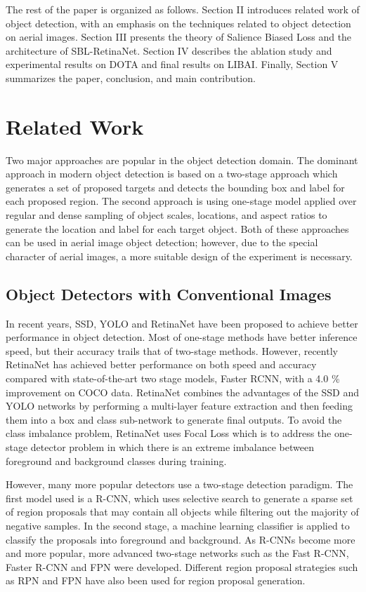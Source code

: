 \documentclass[conference]{IEEEtran}
\begin{document}
    The rest of the paper is organized as follows. Section II introduces related work of object detection, with an emphasis on the techniques related to object detection on aerial images. Section III presents the theory of Salience Biased Loss and the architecture of SBL-RetinaNet. Section IV describes the ablation study and experimental results on DOTA and final results on LIBAI. Finally, Section V summarizes the paper, conclusion, and main contribution.
\section{Related Work}		
Two major approaches are popular in the object detection domain. The dominant approach in modern object detection is based on a two-stage approach which generates a set of proposed targets and detects the bounding box and label for each proposed region. The second approach is using one-stage model applied over regular and dense sampling of object scales, locations, and aspect ratios to generate the location and label for each target object. Both of these approaches can be used in aerial image object detection; however, due to the special character of aerial images, a more suitable design of the experiment is necessary.

	\subsection{Object Detectors with Conventional Images }
    In recent years, SSD\cite{liu2016ssd}, YOLO\cite{redmon2017yolo9000} and RetinaNet\cite{lin2017focal} have been proposed to achieve better performance in object detection. Most of one-stage methods have better inference speed, but their accuracy trails that of two-stage methods. However, recently RetinaNet\cite{lin2017focal} has achieved better performance on both speed and accuracy compared with state-of-the-art two stage models, Faster RCNN\cite{ren2015faster}, with a 4.0 \% improvement on COCO data\cite{lin2014microsoft}.  RetinaNet\cite{lin2017focal} combines the advantages of the SSD\cite{liu2016ssd} and YOLO\cite{redmon2017yolo9000} networks by performing a  multi-layer feature extraction and then feeding them into a box and class sub-network to generate final outputs. To avoid the class imbalance problem, RetinaNet\cite{lin2017focal} uses Focal Loss which is to address the one-stage detector problem in which there is an extreme imbalance between foreground and background classes during training.
    
	 However, many more popular detectors use a two-stage detection paradigm. The first model used is a R-CNN\cite{girshick2014rich}, which uses selective search to generate a sparse set of region proposals that may contain all objects while filtering out the majority of negative samples. In the second stage, a machine learning classifier is applied to classify the proposals into foreground and background. As R-CNNs\cite{girshick2014rich} become more and more popular, more advanced two-stage networks such as the Fast R-CNN\cite{girshick2015fast}, Faster R-CNN\cite{ren2015faster} and FPN\cite{lin2017feature} were developed. Different region proposal strategies such as RPN\cite{ren2015faster} and FPN\cite{lin2017feature} have also been used for region proposal generation. 
\end{document}
